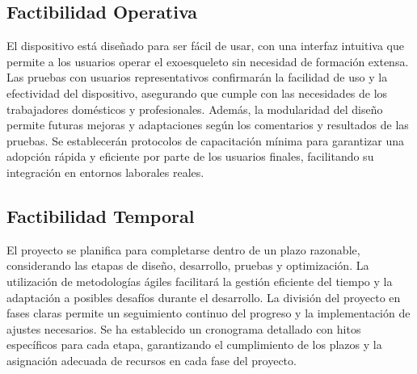 \subsection{Factibilidad Operativa}
El dispositivo está diseñado para ser fácil de usar, con una interfaz intuitiva que permite a los usuarios operar el exoesqueleto sin necesidad de formación extensa. Las pruebas con usuarios representativos confirmarán la facilidad de uso y la efectividad del dispositivo, asegurando que cumple con las necesidades de los trabajadores domésticos y profesionales. Además, la modularidad del diseño permite futuras mejoras y adaptaciones según los comentarios y resultados de las pruebas. Se establecerán protocolos de capacitación mínima para garantizar una adopción rápida y eficiente por parte de los usuarios finales, facilitando su integración en entornos laborales reales.

\subsection{Factibilidad Temporal}
El proyecto se planifica para completarse dentro de un plazo razonable, considerando las etapas de diseño, desarrollo, pruebas y optimización. La utilización de metodologías ágiles facilitará la gestión eficiente del tiempo y la adaptación a posibles desafíos durante el desarrollo. La división del proyecto en fases claras permite un seguimiento continuo del progreso y la implementación de ajustes necesarios. Se ha establecido un cronograma detallado con hitos específicos para cada etapa, garantizando el cumplimiento de los plazos y la asignación adecuada de recursos en cada fase del proyecto.
